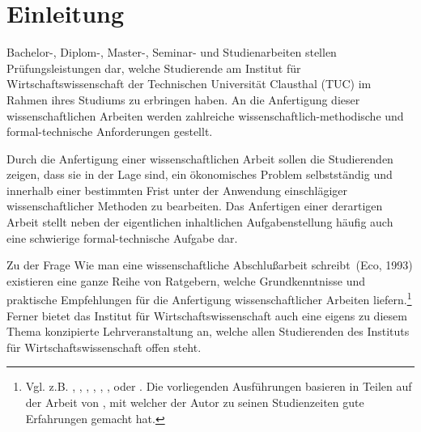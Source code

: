 \documentclass[a4paper, 12pt]{article}
\renewcommand{\baselinestretch}{1.3}
\begin{document}
\singlespacing

\begin{acronym}[XXXXX]
\end{acronym}

\listoftables {}
\renewcommand{\baselinestretch}{1.5}
 \pagebreak


\setcounter{page}{1}

\clearpage \setcounter{footnote}{0}
\setlength{\parskip}{6pt}

\sloppy
\renewcommand{\thefootnote}{\arabic{footnote}}

\section{Einleitung}

Bachelor-, Diplom-, Master-, Seminar- und Studienarbeiten stellen
Pr\"{u}fungs\-leistungen dar, welche Studierende am Institut f\"{u}r Wirtschaftswissenschaft
der Technischen Universit\"{a}t Clausthal (\acs{TUC}) im Rahmen ihres Studiums zu
erbringen haben. An die Anfertigung dieser wissenschaftlichen Arbeiten werden
zahlreiche wissenschaftlich-methodische und formal-technische Anforderungen
gestellt.

Durch die Anfertigung einer wissenschaftlichen Arbeit sollen die Studierenden
zeigen, dass sie in der Lage sind, ein \"{o}konomisches Problem selbstst\"{a}ndig und
innerhalb einer bestimmten Frist unter der Anwendung einschl\"{a}giger
wissenschaftlicher Methoden zu bearbeiten. Das Anfertigen einer derartigen Arbeit
stellt neben der eigentlichen inhaltlichen Aufgabenstellung h\"{a}ufig auch eine
schwierige formal-technische Aufgabe dar.

Zu der Frage \glqq Wie man eine wissenschaftliche Abschlu\ss arbeit schreibt\grqq\
(Eco, 1993) existieren eine ganze Reihe von Ratgebern, welche Grundkenntnisse und
praktische Empfehlungen f\"{u}r die Anfertigung wissenschaftlicher Arbeiten
liefern.\footnote{Vgl. z.B. \cite{bri2005}, \cite{rop2005}, \cite{fra2004},
\cite{dis1998}, \cite{bae1996}, \cite{cor1996}, \cite{eco1993} oder \cite{the1993}.
Die vorliegenden Ausf\"{u}hrungen basieren in Teilen auf der Arbeit von \cite{rid2001},
mit welcher der Autor zu seinen Studienzeiten gute Erfahrungen gemacht hat.} Ferner
bietet das Institut f\"{u}r Wirtschaftswissenschaft auch eine eigens zu diesem Thema
konzipierte Lehrveranstaltung an, welche allen Studierenden des Instituts f\"{u}r
Wirtschaftswissenschaft offen steht.
\end{document}
